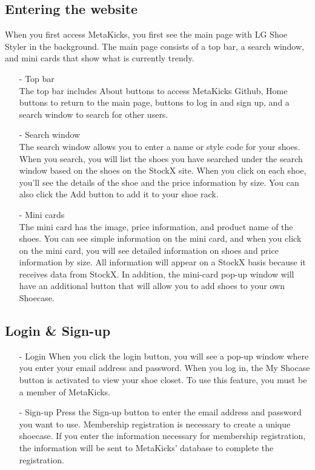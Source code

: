 \documentclass[conference]{IEEEtran}
\begin{document}
\begin{enumerate}
\subsection{Entering the website}
When you first access MetaKicks, you first see the main page with LG Shoe Styler in the background. The main page consists of a top bar, a search window, and mini cards that show what is currently trendy.\\
\begin{enumerate}
\item[-]Top bar\\
The top bar includes About buttons to access MetaKicks Github, Home buttons to return to the main page, buttons to log in and sign up, and a search window to search for other users.\\
\item[-]Search window\\
The search window allows you to enter a name or style code for your shoes. When you search, you will list the shoes you have searched under the search window based on the shoes on the StockX site. When you click on each shoe, you'll see the details of the shoe and the price information by size. You can also click the Add button to add it to your shoe rack.\\
\item[-]Mini cards\\
The mini card has the image, price information, and product name of the shoes. You can see simple information on the mini card, and when you click on the mini card, you will see detailed information on shoes and price information by size. All information will appear on a StockX basis because it receives data from StockX. In addition, the mini-card pop-up window will have an additional button that will allow you to add shoes to your own Shoecase.\\
\end{enumerate}

\subsection{Login \& Sign-up}
\begin{enumerate}
\item[-]Login
When you click the login button, you will see a pop-up window where you enter your email address and password. When you log in, the My Shocase button is activated to view your shoe closet. To use this feature, you must be a member of MetaKicks.\\
\item[-]Sign-up
Press the Sign-up button to enter the email address and password you want to use. Membership registration is necessary to create a unique shoecase. If you enter the information necessary for membership registration, the information will be sent to MetaKicks' database to complete the registration.\\
\end{enumerate}

\end{enumerate}
\end{document}
